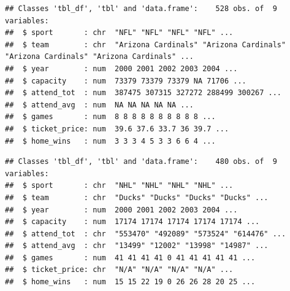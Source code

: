 \documentclass[man]{apa6}
\newenvironment{Shaded}{\begin{snugshade}}{\end{snugshade}}
\newcommand{\DataTypeTok}[1]{\textcolor[rgb]{0.13,0.29,0.53}{#1}}
\newcommand{\KeywordTok}[1]{\textcolor[rgb]{0.13,0.29,0.53}{\textbf{#1}}}
\newcommand{\NormalTok}[1]{#1}
\newcommand{\OperatorTok}[1]{\textcolor[rgb]{0.81,0.36,0.00}{\textbf{#1}}}
\newcommand{\StringTok}[1]{\textcolor[rgb]{0.31,0.60,0.02}{#1}}
\begin{document}
\begin{verbatim}
## Classes 'tbl_df', 'tbl' and 'data.frame':    528 obs. of  9 variables:
##  $ sport       : chr  "NFL" "NFL" "NFL" "NFL" ...
##  $ team        : chr  "Arizona Cardinals" "Arizona Cardinals" "Arizona Cardinals" "Arizona Cardinals" ...
##  $ year        : num  2000 2001 2002 2003 2004 ...
##  $ capacity    : num  73379 73379 73379 NA 71706 ...
##  $ attend_tot  : num  387475 307315 327272 288499 300267 ...
##  $ attend_avg  : num  NA NA NA NA NA ...
##  $ games       : num  8 8 8 8 8 8 8 8 8 8 ...
##  $ ticket_price: num  39.6 37.6 33.7 36 39.7 ...
##  $ home_wins   : num  3 3 3 4 5 3 3 6 6 4 ...
\end{verbatim}

\begin{Shaded}
\end{Shaded}

\begin{verbatim}
## Classes 'tbl_df', 'tbl' and 'data.frame':    480 obs. of  9 variables:
##  $ sport       : chr  "NHL" "NHL" "NHL" "NHL" ...
##  $ team        : chr  "Ducks" "Ducks" "Ducks" "Ducks" ...
##  $ year        : num  2000 2001 2002 2003 2004 ...
##  $ capacity    : num  17174 17174 17174 17174 17174 ...
##  $ attend_tot  : chr  "553470" "492089" "573524" "614476" ...
##  $ attend_avg  : chr  "13499" "12002" "13998" "14987" ...
##  $ games       : num  41 41 41 41 0 41 41 41 41 41 ...
##  $ ticket_price: chr  "N/A" "N/A" "N/A" "N/A" ...
##  $ home_wins   : num  15 15 22 19 0 26 26 28 20 25 ...
\end{verbatim}

\begin{Shaded}
\end{Shaded}
\end{document}

